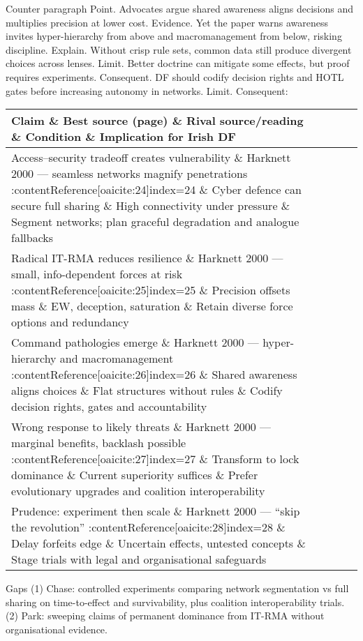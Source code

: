 Counter paragraph
Point. Advocates argue shared awareness aligns decisions and multiplies precision at lower cost.
Evidence. Yet the paper warns awareness invites hyper-hierarchy from above and macromanagement from below, risking discipline. {\small }
Explain. Without crisp rule sets, common data still produce divergent choices across lenses.
Limit. Better doctrine can mitigate some effects, but proof requires experiments.
Consequent. DF should codify decision rights and HOTL gates before increasing autonomy in networks. Limit. Consequent:

\begin{tabular}{p{3.2cm}p{4.2cm}p{3.6cm}p{3.2cm}p{4.2cm}}
	\textbf{Claim} \& \textbf{Best source (page)} \& \textbf{Rival source/reading} \& \textbf{Condition} \& \textbf{Implication for Irish DF}\\\hline
	Access–security tradeoff creates vulnerability \& Harknett 2000 — seamless networks magnify penetrations {\small :contentReference[oaicite:24]{index=24}} \& Cyber defence can secure full sharing \& High connectivity under pressure \& Segment networks; plan graceful degradation and analogue fallbacks \\
	Radical IT-RMA reduces resilience \& Harknett 2000 — small, info-dependent forces at risk {\small :contentReference[oaicite:25]{index=25}} \& Precision offsets mass \& EW, deception, saturation \& Retain diverse force options and redundancy \\
	Command pathologies emerge \& Harknett 2000 — hyper-hierarchy and macromanagement {\small :contentReference[oaicite:26]{index=26}} \& Shared awareness aligns choices \& Flat structures without rules \& Codify decision rights, gates and accountability \\
	Wrong response to likely threats \& Harknett 2000 — marginal benefits, backlash possible {\small :contentReference[oaicite:27]{index=27}} \& Transform to lock dominance \& Current superiority suffices \& Prefer evolutionary upgrades and coalition interoperability \\
	Prudence: experiment then scale \& Harknett 2000 — “skip the revolution” {\small :contentReference[oaicite:28]{index=28}} \& Delay forfeits edge \& Uncertain effects, untested concepts \& Stage trials with legal and organisational safeguards \\\hline
\end{tabular}

Gaps
(1) Chase: controlled experiments comparing network segmentation vs full sharing on time-to-effect and survivability, plus coalition interoperability trials.
(2) Park: sweeping claims of permanent dominance from IT-RMA without organisational evidence.

